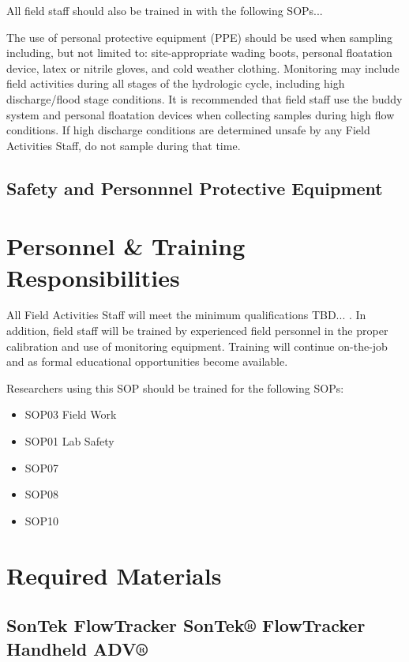 \documentclass[12pt]{../SOP3_beta}\usepackage[]{graphicx}\usepackage[]{xcolor}
\begin{document}
\NP All field staff should also be trained in with the following SOPs...

\NP The use of personal protective equipment (PPE) should be used when sampling
including, but not limited to: site-appropriate wading boots, personal floatation device,
latex or nitrile gloves, and cold weather clothing.
Monitoring may include field activities during all stages of the hydrologic cycle, including
high discharge/flood stage conditions. It is recommended that field staff use the buddy
system and personal floatation devices when collecting samples during high flow
conditions. If high discharge conditions are determined unsafe by any Field Activities
Staff, do not sample during that time.

\subsection{Safety and Personnnel Protective Equipment}


\section{Personnel \& Training Responsibilities}

\NP All Field Activities Staff will meet the minimum qualifications TBD... .
In addition, field staff will be trained by experienced field personnel in the proper
calibration and use of monitoring equipment. Training will continue on-the-job and as
formal educational opportunities become available.

Researchers using this SOP should be trained for the following SOPs:

\begin{itemize}
  \item SOP03 Field Work
  \item SOP01 Lab Safety
  \item SOP07
  \item SOP08
  \item SOP10
\end{itemize}

\section{Required Materials}

\subsection{SonTek FlowTracker SonTek® FlowTracker Handheld ADV®}
\end{document}
